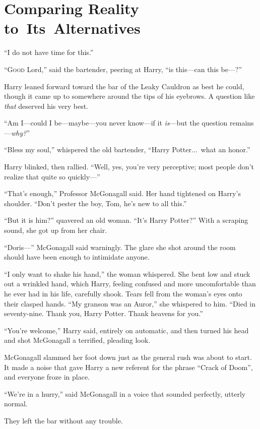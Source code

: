 \chapter{Comparing Reality to~Its~Alternatives}

\epigraph{“I do not have time for this.”}{}

\lettrine{“G}{ood} Lord,” said the bartender, peering at Harry, “is this—can this be—?”

Harry leaned forward toward the bar of the Leaky Cauldron as best he could, though it came up to somewhere around the tips of his eyebrows. A question like \emph{that} deserved his very best.

“Am I—could I be—maybe—you never know—if it \emph{is}—but the question remains—\emph{why?}”

“Bless my soul,” whispered the old bartender, “Harry Potter...\ what an honor.”

Harry blinked, then rallied. “Well, yes, you’re very perceptive; most people don’t realize that quite so quickly—”

“That’s enough,” Professor McGonagall said. Her hand tightened on Harry’s shoulder. “Don’t pester the boy, Tom, he’s new to all this.”

“But it is him?” quavered an old woman. “It’s Harry Potter?” With a scraping sound, she got up from her chair.

“Doris—” McGonagall said warningly. The glare she shot around the room should have been enough to intimidate anyone.

“I only want to shake his hand,” the woman whispered. She bent low and stuck out a wrinkled hand, which Harry, feeling confused and more uncomfortable than he ever had in his life, carefully shook. Tears fell from the woman’s eyes onto their clasped hands. “My granson was an Auror,” she whispered to him. “Died in seventy-nine. Thank you, Harry Potter. Thank heavens for you.”

“You’re welcome,” Harry said, entirely on automatic, and then turned his head and shot McGonagall a terrified, pleading look.

McGonagall slammed her foot down just as the general rush was about to start. It made a noise that gave Harry a new referent for the phrase “Crack of Doom”, and everyone froze in place.

“We’re in a hurry,” said McGonagall in a voice that sounded perfectly, utterly normal.

They left the bar without any trouble.

